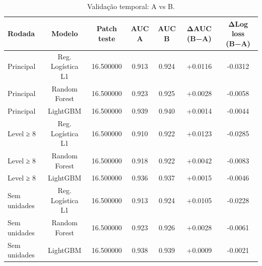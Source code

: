 \begin{table}[htbp]
\caption{Validação temporal: A vs B.}
\label{tab:abtemp}
\centering
\small
\begin{tabular}{lcccccc}
\toprule
Rodada & Modelo & Patch teste & AUC A & AUC B & ΔAUC (B−A) & ΔLog loss (B−A) \\
\midrule
Principal & Reg. Logística L1 & 16.500000 & 0.913 & 0.924 & +0.0116 & -0.0312 \\
Principal & Random Forest & 16.500000 & 0.923 & 0.925 & +0.0028 & -0.0058 \\
Principal & LightGBM & 16.500000 & 0.939 & 0.940 & +0.0014 & -0.0044 \\
Level ≥ 8 & Reg. Logística L1 & 16.500000 & 0.910 & 0.922 & +0.0123 & -0.0285 \\
Level ≥ 8 & Random Forest & 16.500000 & 0.918 & 0.922 & +0.0042 & -0.0083 \\
Level ≥ 8 & LightGBM & 16.500000 & 0.936 & 0.937 & +0.0015 & -0.0046 \\
Sem unidades & Reg. Logística L1 & 16.500000 & 0.913 & 0.924 & +0.0105 & -0.0228 \\
Sem unidades & Random Forest & 16.500000 & 0.923 & 0.926 & +0.0028 & -0.0061 \\
Sem unidades & LightGBM & 16.500000 & 0.938 & 0.939 & +0.0009 & -0.0021 \\
\bottomrule
\end{tabular}
\end{table}
